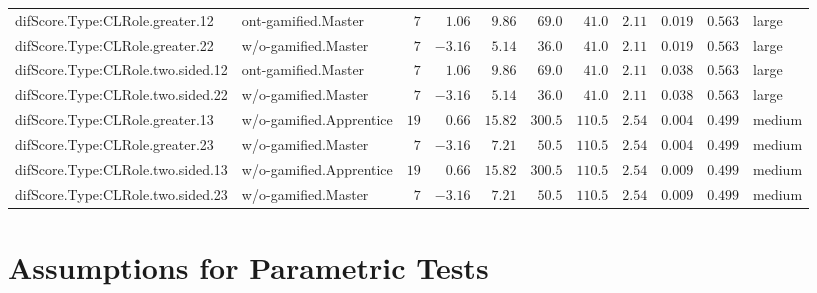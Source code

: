 \documentclass[6pt,a4paper]{article}
\begin{document}
\begin{landscape}
{\begin{longtable}{llrrrrrrrrl}
difScore.Type:CLRole.greater.12&ont-gamified.Master&$ 7$&$ 1.06$&$ 9.86$&$ 69.0$&$ 41.0$&$2.11$&$0.019$&$0.563$&large\tabularnewline
difScore.Type:CLRole.greater.22&w/o-gamified.Master&$ 7$&$-3.16$&$ 5.14$&$ 36.0$&$ 41.0$&$2.11$&$0.019$&$0.563$&large\tabularnewline
difScore.Type:CLRole.two.sided.12&ont-gamified.Master&$ 7$&$ 1.06$&$ 9.86$&$ 69.0$&$ 41.0$&$2.11$&$0.038$&$0.563$&large\tabularnewline
difScore.Type:CLRole.two.sided.22&w/o-gamified.Master&$ 7$&$-3.16$&$ 5.14$&$ 36.0$&$ 41.0$&$2.11$&$0.038$&$0.563$&large\tabularnewline
difScore.Type:CLRole.greater.13&w/o-gamified.Apprentice&$19$&$ 0.66$&$15.82$&$300.5$&$110.5$&$2.54$&$0.004$&$0.499$&medium\tabularnewline
difScore.Type:CLRole.greater.23&w/o-gamified.Master&$ 7$&$-3.16$&$ 7.21$&$ 50.5$&$110.5$&$2.54$&$0.004$&$0.499$&medium\tabularnewline
difScore.Type:CLRole.two.sided.13&w/o-gamified.Apprentice&$19$&$ 0.66$&$15.82$&$300.5$&$110.5$&$2.54$&$0.009$&$0.499$&medium\tabularnewline
difScore.Type:CLRole.two.sided.23&w/o-gamified.Master&$ 7$&$-3.16$&$ 7.21$&$ 50.5$&$110.5$&$2.54$&$0.009$&$0.499$&medium\tabularnewline
\hline
\end{longtable}}

\end{landscape}

\section{Assumptions for Parametric Tests}
\end{document}
